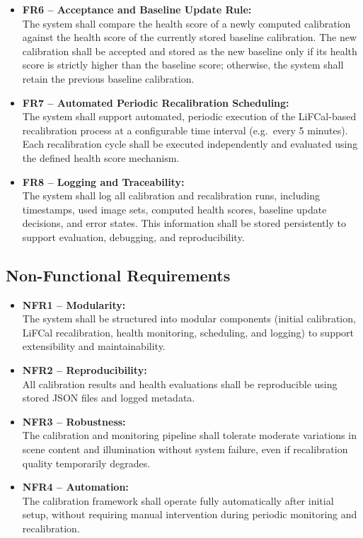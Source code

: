 \documentclass[12pt]{scrartcl}
\begin{document}
\begin{itemize}
  \item \textbf{FR6 – Acceptance and Baseline Update Rule:} \\
  The system shall compare the health score of a newly computed calibration
  against the health score of the currently stored baseline calibration.
  The new calibration shall be accepted and stored as the new baseline
  only if its health score is strictly higher than the baseline score;
  otherwise, the system shall retain the previous baseline calibration.

  \item \textbf{FR7 – Automated Periodic Recalibration Scheduling:} \\
  The system shall support automated, periodic execution of the LiFCal-based
  recalibration process at a configurable time interval (e.g.\ every 5 minutes).
  Each recalibration cycle shall be executed independently and evaluated
  using the defined health score mechanism.

  \item \textbf{FR8 – Logging and Traceability:} \\
  The system shall log all calibration and recalibration runs,
  including timestamps, used image sets, computed health scores,
  baseline update decisions, and error states.
  This information shall be stored persistently to support evaluation,
  debugging, and reproducibility.


\end{itemize}

\subsection*{Non-Functional Requirements}
\begin{itemize}
 \item \textbf{NFR1 – Modularity:} \\
  The system shall be structured into modular components
  (initial calibration, LiFCal recalibration, health monitoring,
  scheduling, and logging) to support extensibility and maintainability.

  \item \textbf{NFR2 – Reproducibility:} \\
  All calibration results and health evaluations shall be reproducible
  using stored JSON files and logged metadata.

  \item \textbf{NFR3 – Robustness:} \\
  The calibration and monitoring pipeline shall tolerate moderate
  variations in scene content and illumination without system failure,
  even if recalibration quality temporarily degrades.

  \item \textbf{NFR4 – Automation:} \\
  The calibration framework shall operate fully automatically
  after initial setup, without requiring manual intervention
  during periodic monitoring and recalibration.
\end{itemize}
\end{document}
